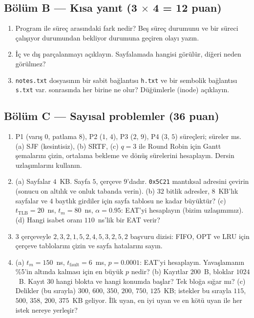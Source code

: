 \subsection*{Bölüm B --- Kısa yanıt (3 $\times$ 4 = 12 puan)}
\begin{enumerate}[leftmargin=1.6em,label=B\arabic*.]
  \item Program ile süreç arasındaki fark nedir? Beş süreç durumunu ve bir süreci çalışıyor durumundan bekliyor durumuna geçiren olayı yazın. 
  \item İç ve dış parçalanmayı açıklayın. Sayfalamada hangisi görülür, diğeri neden görülmez? 
  \item \texttt{notes.txt} dosyasının bir sabit bağlantısı \texttt{h.txt} ve bir sembolik bağlantısı \texttt{s.txt} var.  sonrasında her birine ne olur? Düğümlerle (inode) açıklayın. 
\end{enumerate}

\subsection*{Bölüm C --- Sayısal problemler (36 puan)}
\begin{enumerate}[leftmargin=1.6em,label=C\arabic*.]
  \item P1 (varış $0$, patlama $8$), P2 ($1$, $4$), P3 ($2$, $9$), P4 ($3$, $5$) süreçleri; süreler ms. (a) SJF (kesintisiz), (b) SRTF, (c) $q = 3$ ile Round Robin için Gantt şemalarını çizin, ortalama bekleme ve dönüş sürelerini hesaplayın. Dersin uzlaşımlarını kullanın. 
  \item (a) Sayfalar $4$~KB. Sayfa $5$, çerçeve $9$'dadır. \texttt{0x5C21} mantıksal adresini çevirin (sonucu on altılık ve onluk tabanda verin). (b) $32$ bitlik adresler, $8$~KB'lık sayfalar ve $4$ baytlık girdiler için sayfa tablosu ne kadar büyüktür? (c) $t_{\text{TLB}} = 20$~ns, $t_m = 80$~ns, $\alpha = 0.95$: EAT'yi hesaplayın (bizim uzlaşımımız). (d) Hangi isabet oranı $110$~ns'lik bir EAT verir? 
  \item $3$ çerçeveyle $2, 3, 2, 1, 5, 2, 4, 5, 3, 2, 5, 2$ başvuru dizisi: FIFO, OPT ve LRU için çerçeve tablolarını çizin ve sayfa hatalarını sayın. 
  \item (a) $t_m = 150$~ns, $t_{\text{fault}} = 6$~ms, $p = 0.0001$: EAT'yi hesaplayın. Yavaşlamanın \%5'in altında kalması için en büyük $p$ nedir? (b) Kayıtlar $200$~B, bloklar $1024$~B. Kayıt $30$ hangi blokta ve hangi konumda başlar? Tek bloğa sığar mı? (c) Delikler (bu sırayla) $300$, $600$, $350$, $200$, $750$, $125$~KB; istekler bu sırayla $115$, $500$, $358$, $200$, $375$~KB geliyor. İlk uyan, en iyi uyan ve en kötü uyan ile her istek nereye yerleşir? 
\end{enumerate}

